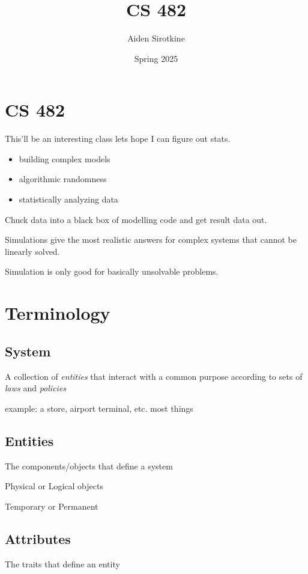 \documentclass[fleqn]{report}
\date{Spring 2025}
\title{CS 482}
\author{Aiden Sirotkine}
\newcommand{\hp}{\hspace{1cm}}
\begin{document}
\pagestyle{fancy}
\maketitle
\tableofcontents
\clearpage

\chapter{CS 482}
This'll be an interesting class lets hope I can figure out stats.

\begin{itemize}
    \item 
    building complex models 
    \item 
    algorithmic randomness 
    \item 
    statistically analyzing data
\end{itemize}

Chuck data into a black box of modelling code and get result data out. 

Simulations give the most realistic answers for complex systems that cannot be 
linearly solved. 

Simulation is only good for basically unsolvable problems. 

\chapter{Terminology}

\section{System}
A collection of \textit{entities} that interact with a common 
purpose according to sets of \textit{laws} and \textit{policies}

example: a store, airport terminal, etc. \hp most things 

\section{Entities}
The components/objects that define a system

Physical or Logical objects 

Temporary or Permanent 

\section{Attributes}
The traits that define an entity 
\end{document}
